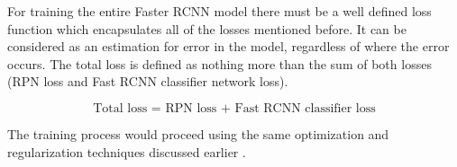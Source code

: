 For training the entire Faster RCNN model there must be a well defined loss function which encapsulates all of the losses mentioned before. It can be considered as an estimation for error in the model, regardless of where the error occurs. The total loss is defined as nothing more than the sum of both losses (RPN loss and Fast RCNN classifier network loss).

\begin{equation}
  \text{Total loss = RPN loss + Fast RCNN classifier loss}
\end{equation}

The training process would proceed using the same optimization and regularization techniques discussed earlier \cite{b1}.
